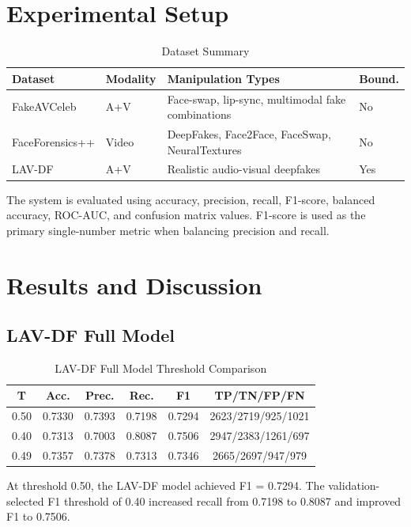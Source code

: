 \documentclass[conference]{IEEEtran}
\begin{document}
\section{Experimental Setup}
\begin{table}[htbp]
\caption{Dataset Summary}
\centering
\begin{tabular}{p{1.55cm}p{1.4cm}p{2.4cm}p{0.7cm}}
\toprule
Dataset & Modality & Manipulation Types & Bound. \\
\midrule
FakeAVCeleb & A+V & Face-swap, lip-sync, multimodal fake combinations & No \\
FaceForensics++ & Video & DeepFakes, Face2Face, FaceSwap, NeuralTextures & No \\
LAV-DF & A+V & Realistic audio-visual deepfakes & Yes \\
\bottomrule
\end{tabular}
\end{table}

The system is evaluated using accuracy, precision, recall, F1-score, balanced accuracy, ROC-AUC, and confusion matrix values. F1-score is used as the primary single-number metric when balancing precision and recall.

\section{Results and Discussion}
\subsection{LAV-DF Full Model}
\begin{table}[htbp]
\caption{LAV-DF Full Model Threshold Comparison}
\centering
\begin{tabular}{cccccc}
\toprule
T & Acc. & Prec. & Rec. & F1 & TP/TN/FP/FN \\
\midrule
0.50 & 0.7330 & 0.7393 & 0.7198 & 0.7294 & 2623/2719/925/1021 \\
0.40 & 0.7313 & 0.7003 & 0.8087 & 0.7506 & 2947/2383/1261/697 \\
0.49 & 0.7357 & 0.7378 & 0.7313 & 0.7346 & 2665/2697/947/979 \\
\bottomrule
\end{tabular}
\end{table}

At threshold 0.50, the LAV-DF model achieved F1 = 0.7294. The validation-selected F1 threshold of 0.40 increased recall from 0.7198 to 0.8087 and improved F1 to 0.7506.
\end{document}
